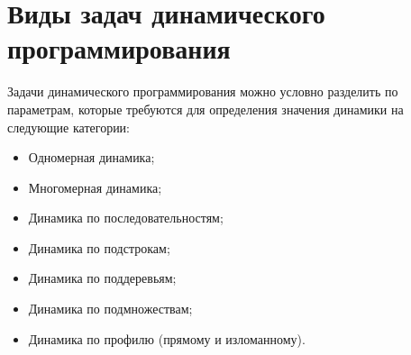 \section{Виды задач динамического программирования}

Задачи динамического программирования можно условно разделить по параметрам, которые требуются для определения значения динамики
на следующие категории:
\begin{itemize}
\item Одномерная динамика;
\item Многомерная динамика;
\item Динамика по последовательностям;
\item Динамика по подстрокам;
\item Динамика по поддеревьям;
\item Динамика по подмножествам;
\item Динамика по профилю (прямому и изломанному).
\end{itemize}